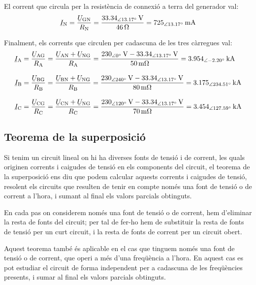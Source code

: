 \begin{exemple}
El corrent  que circula per la resist\`{e}ncia de connexi\'{o} a terra del generador val:
\[
\cmplx{I}\ped{N} = \frac{\cmplx{U}\ped{GN}}{R\ped{N}} = \frac{\SIpd{33,34}{13,17}{V}}{\SI{46}{\ohm}}
= \SIpd{725}{13,17}{mA}
\]

Finalment, els corrents que circulen per cadascuna de les tres c\`{a}rregues val:
\begin{align*}
\cmplx{I}\ped{A} &= \frac{\cmplx{U}\ped{AG}}{R\ped{A}} = \frac{\cmplx{U}\ped{AN} + \cmplx{U}\ped{NG}}{R\ped{A}} = \frac{\SIpd{230}{0}{V}-\SIpd{33,34}{13,17}{V}}{\SI{50}{m\ohm}}
= \SIpd{3,954}{-2,20}{kA}\\[2ex]
\cmplx{I}\ped{B} &= \frac{\cmplx{U}\ped{BG}}{R\ped{B}} = \frac{\cmplx{U}\ped{BN} + \cmplx{U}\ped{NG}}{R\ped{B}} = \frac{\SIpd{230}{240}{V}-\SIpd{33,34}{13,17}{V}}{\SI{80}{m\ohm}}
= \SIpd{3,175}{234,51}{kA}\\[2ex]
\cmplx{I}\ped{C} &= \frac{\cmplx{U}\ped{CG}}{R\ped{C}} = \frac{\cmplx{U}\ped{CN} + \cmplx{U}\ped{NG}}{R\ped{C}} = \frac{\SIpd{230}{120}{V}-\SIpd{33,34}{13,17}{V}}{\SI{70}{m\ohm}}
= \SIpd{3,454}{127,59}{kA}
\end{align*}

\end{exemple}


\subsection{Teorema de la superposici\'{o}}

Si tenim un circuit lineal on hi ha diverses fonts de tensi\'{o} i  de
corrent, les quals originen corrents i caigudes de tensi\'{o} en els
components del circuit, el teorema de la superposici\'{o} ens diu que
podem calcular aquests corrents i caigudes de tensi\'{o}, resolent els
circuits que resulten de tenir en compte  nom\'{e}s una font de tensi\'{o} o
de corrent a l'hora, i sumant al final els valors parcials
obtinguts.

En cada pas on considerem nom\'{e}s una font de tensi\'{o} o de corrent, hem
d'eliminar la resta de fonts del circuit; per tal de fer-ho hem de
substituir la resta de fonts de tensi\'{o} per un curt circuit, i la
resta de fonts de corrent per un circuit obert.

Aquest teorema tamb\'{e} \'{e}s aplicable en el cas que tinguem nom\'{e}s una
font de tensi\'{o} o de corrent, que operi a m\'{e}s d'una freq\"{u}\`{e}ncia a
l'hora. En aquest cas es pot estudiar el circuit de forma
independent per a cadascuna de les freq\"{u}\`{e}ncies presents, i sumar al
final els valors parcials obtinguts.

